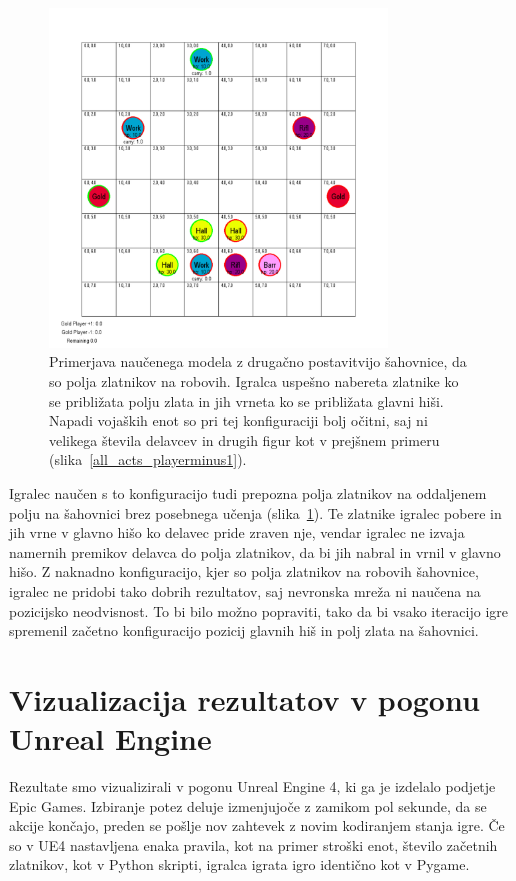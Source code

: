 \documentclass[a4paper, 12pt]{book}
\begin{document}
\begin{figure}[h!]
	\begin{center}
		\includegraphics[width=0.8\textwidth]{photos/pit_minerals_apart_100.pdf}
	\end{center}
	\caption{Primerjava naučenega modela z drugačno postavitvijo šahovnice, da so polja zlatnikov na robovih.
		Igralca uspešno nabereta zlatnike ko se približata polju zlata in jih vrneta ko se približata glavni hiši.
		Napadi vojaških enot so pri tej konfiguraciji bolj očitni, saj ni velikega števila delavcev in drugih figur kot v prejšnem primeru (slika~\ref{all_acts_playerminus1}).}
	\label{pit_minerals_apart_100}
\end{figure}

Igralec naučen s to konfiguracijo tudi prepozna polja zlatnikov na oddaljenem polju na šahovnici brez posebnega učenja (slika~\ref{pit_minerals_apart_100}).
Te zlatnike igralec pobere in jih vrne v glavno hišo ko delavec pride zraven nje, vendar igralec ne izvaja namernih premikov delavca do polja zlatnikov, da bi jih nabral in vrnil v glavno hišo.
Z naknadno konfiguracijo, kjer so polja zlatnikov na robovih šahovnice, igralec ne pridobi tako dobrih rezultatov, saj nevronska mreža ni naučena na pozicijsko neodvisnost.
To bi bilo možno popraviti, tako da bi vsako iteracijo igre spremenil začetno konfiguracijo pozicij glavnih hiš in polj zlata na šahovnici.


\section{Vizualizacija rezultatov v pogonu Unreal Engine}
Rezultate smo vizualizirali v pogonu Unreal Engine 4, ki ga je izdelalo podjetje Epic Games.
Izbiranje potez deluje izmenjujoče z zamikom pol sekunde, da se akcije končajo, preden se pošlje nov zahtevek z novim kodiranjem stanja igre.
Če so v UE4 nastavljena enaka pravila, kot na primer stroški enot, število začetnih zlatnikov, kot v Python skripti, igralca igrata igro identično kot v Pygame.
\end{document}
